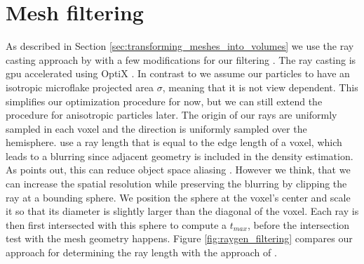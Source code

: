 \section{Mesh filtering}
\label{sec:mesh_filtering}
As described in Section \ref{sec:transforming_meshes_into_volumes} we use the ray casting approach by \citeauthor{hybrid_mesh_volume_lods} with a few modifications for our filtering \cite{hybrid_mesh_volume_lods}.
The ray casting is \ac{gpu} accelerated using OptiX \cite{parker_optix}.
In contrast to \citeauthor{hybrid_mesh_volume_lods} we assume our particles to have an isotropic microflake projected area $\sigma$, meaning that it is not view dependent.
This simplifies our optimization procedure for now, but we can still extend the procedure for anisotropic particles later.
The origin of our rays are uniformly sampled in each voxel and the direction is uniformly sampled over the hemisphere.
\citeauthor{hybrid_mesh_volume_lods} use a ray length that is equal to the edge length of a voxel, which leads to a blurring since adjacent geometry is included in the density estimation.
As \citeauthor{wang_object_space_aliasing} points out, this can reduce object space aliasing \cite{wang_object_space_aliasing}.
However we think, that we can increase the spatial resolution while preserving the blurring by clipping the ray at a bounding sphere.
We position the sphere at the voxel's center and scale it so that its diameter is slightly larger than the diagonal of the voxel.
Each ray is then first intersected with this sphere to compute a $t_{max}$, before the intersection test with the mesh geometry happens.
Figure \ref{fig:raygen_filtering} compares our approach for determining the ray length with the approach of \citeauthor{hybrid_mesh_volume_lods}.
